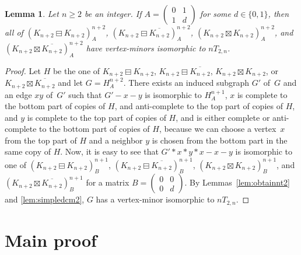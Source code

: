 \documentclass[11pt]{article}
\newtheorem{lemma}[theorem]{Lemma}
\newcommand\mat{\boxminus}
\newcommand\antimat{\boxtimes}
\def\S_#1{\overline{K_{#1}}}
\begin{document}
	\begin{lemma}\label{lem:simpledcm3}
          Let $n\ge 2$  be an integer.
          If $A=(
          \begin{smallmatrix}
            0 & 1\\
            1 & d 
          \end{smallmatrix}
          )$ for some $d\in\{0,1\}$, then
          all of $(K_{n+2}\mat K_{n+2})^{n+2}_A$,
          $(K_{n+2}\mat \S_{n+2})^{n+2}_A$,
          $(K_{n+2}\antimat K_{n+2})^{n+2}_A$,
          and 
          $(K_{n+2}\antimat \S_{n+2})^{n+2}_A$
          have vertex-minors isomorphic to $nT_{2,n}$.
%
%
	\end{lemma}
  \begin{proof}
          Let $H$ be the one of   $K_{n+2}\mat K_{n+2}$,
          $K_{n+2}\mat \S_{n+2}$,
          $K_{n+2}\antimat K_{n+2}$,
          or
          $K_{n+2}\antimat \S_{n+2}$
          and let $G=H^{n+2}_A$.
          There exists an induced subgraph $G'$ of~$G$ and an edge $xy$ of~$G'$
          such that
          $G'- x- y$ is isomorphic to $H^{n+1}_A$,
          $x$ is complete to the bottom part of copies of $H$,
          and anti-complete to the top part of copies of $H$, 
          and 
          $y$ is complete to the top part of copies of $H$, 
          and is either complete or anti-complete to
          the bottom part of copies of $H$,
          because we can choose a vertex~$x$ from the top part of $H$
          and a neighbor $y$ is chosen from the bottom part in the same copy of $H$.
          Now, it is easy to see that $G'*x*y*x-x-y$ is isomorphic to
          one of 
 $(K_{n+2}\mat K_{n+2})^{n+1}_B$,
          $(K_{n+2}\mat \S_{n+2})^{n+1}_B$,
          $(K_{n+2}\antimat K_{n+2})^{n+1}_B$,
          and 
          $(K_{n+2}\antimat \S_{n+2})^{n+1}_B$
          for a matrix $B=
          (\begin{smallmatrix}
            0  & 0\\
            0 & d
          \end{smallmatrix})$.
          By Lemmas~\ref{lem:obtainnt2} and \ref{lem:simpledcm2},
          $G$ has a vertex-minor isomorphic to $nT_{2,n}$.
	\end{proof}



\section{Main proof}\label{sec:mainproof}
\end{document}
